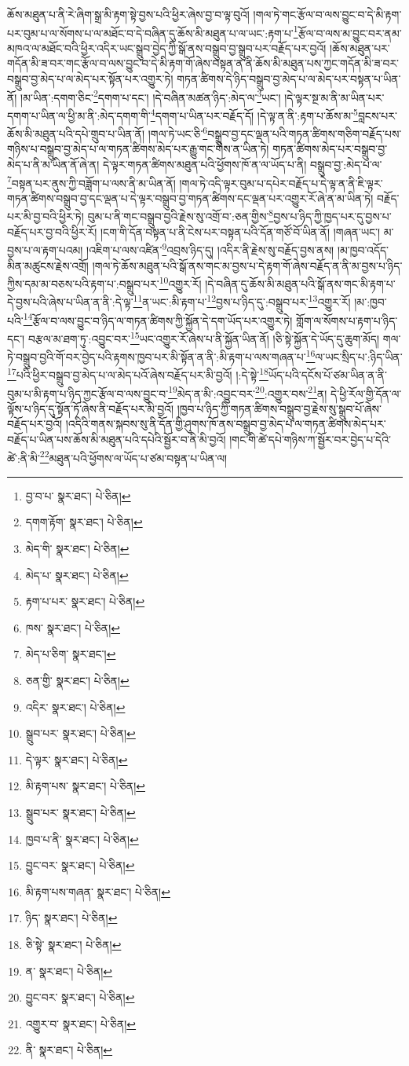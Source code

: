 ཆོས་མཐུན་པ་ནི་རེ་ཞིག་སྒྲ་མི་རྟག་སྟེ་བྱས་པའི་ཕྱིར་ཞེས་བྱ་བ་ལྟ་བུའོ། །གལ་ཏེ་གང་རྩོལ་བ་ལས་བྱུང་བ་དེ་མི་རྟག་པར་བུམ་པ་ལ་སོགས་པ་ལ་མཐོང་བ་དེ་བཞིན་དུ་ཆོས་མི་མཐུན་པ་ལ་ཡང་:རྟག་པ་\footnote{བྱ་བ་པ་  སྣར་ཐང་།  པེ་ཅིན། }རྩོལ་བ་ལས་མ་བྱུང་བར་ནམ་མཁའ་ལ་མཐོང་བའི་ཕྱིར་འདིར་ཡང་སྒྲུབ་བྱེད་ཀྱི་སྒོ་ནས་བསྒྲུབ་བྱ་སྒྲུབ་པར་བརྗོད་པར་བྱའོ། །ཆོས་མཐུན་པར་གདོན་མི་ཟ་བར་གང་རྩོལ་བ་ལས་བྱུང་བ་དེ་མི་རྟག་གོ་ཞེས་བསྟན་ན་ནི་ཆོས་མི་མཐུན་པས་ཀྱང་གདོན་མི་ཟ་བར་བསྒྲུབ་བྱ་མེད་པ་ལ་མེད་པར་སྟོན་པར་འགྱུར་ཏེ། གཏན་ཚིགས་དེ་ཉིད་བསྒྲུབ་བྱ་མེད་པ་ལ་མེད་པར་བསྟན་པ་ཡིན་ནོ། །མ་ཡིན་:དགག་ཅིང་\footnote{དགག་རྟོག་  སྣར་ཐང་།  པེ་ཅིན། }དགག་པ་དང་། །དེ་བཞིན་མཚན་ཉིད་:མེད་ལ་\footnote{མེད་གི་  སྣར་ཐང་།  པེ་ཅིན། }ཡང་། །དེ་ལྟར་སྔ་མ་ནི་མ་ཡིན་པར་དགག་པ་ཡིན་ལ་ཕྱི་མ་ནི་:མེད་དགག་གི་\footnote{མེད་པ་  སྣར་ཐང་།  པེ་ཅིན། }དགག་པ་ཡིན་པར་བརྗོད་དོ། །དེ་ལྟ་ན་ནི་:རྟག་པ་ཆོས་མ་\footnote{རྟག་པ་པར་  སྣར་ཐང་།  པེ་ཅིན། }བླངས་པར་ཆོས་མི་མཐུན་པའི་དཔེ་གྲུབ་པ་ཡིན་ནོ། །གལ་ཏེ་ཡང་ཅི་\footnote{ཁས་  སྣར་ཐང་།  པེ་ཅིན། }བསྒྲུབ་བྱ་དང་ལྡན་པའི་གཏན་ཚིགས་གཅིག་བརྗོད་པས་གཉིས་པ་བསྒྲུབ་བྱ་མེད་པ་ལ་གཏན་ཚིགས་མེད་པར་རྒྱུ་གང་གིས་ན་ཡིན་ཏེ། གཏན་ཚིགས་མེད་པར་བསྒྲུབ་བྱ་མེད་པ་ནི་མ་ཡིན་ནོ་ཞེ་ན། དེ་ལྟར་གཏན་ཚིགས་མཐུན་པའི་ཕྱོགས་ཁོ་ན་ལ་ཡོད་པ་ནི། བསྒྲུབ་བྱ་:མེད་པ་ལ་\footnote{མེད་པ་ཅིག་  སྣར་ཐང་། }བསྟན་པར་ནུས་ཀྱི་བཟློག་པ་ལས་ནི་མ་ཡིན་ནོ། །གལ་ཏེ་འདི་ལྟར་བུམ་པ་དཔེར་བརྗོད་པ་དེ་ལྟ་ན་ནི་ཇི་ལྟར་གཏན་ཚིགས་བསྒྲུབ་བྱ་དང་ལྡན་པ་དེ་ལྟར་བསྒྲུབ་བྱ་གཏན་ཚིགས་དང་ལྡན་པར་འགྱུར་རོ་ཞེ་ན་མ་ཡིན་ཏེ། བརྗོད་པར་མི་བྱ་བའི་ཕྱིར་ཏེ། བུམ་པ་ནི་གང་བསྒྲུབ་བྱའི་རྗེས་སུ་འགྲོ་བ་:ཅན་གྱིས་\footnote{ཅན་གྱི་  སྣར་ཐང་།  པེ་ཅིན། }བྱས་པ་ཉིད་ཀྱི་ཁྱད་པར་དུ་བྱས་པ་བརྗོད་པར་བྱ་བའི་ཕྱིར་རོ། །ངག་གི་དོན་བསྟན་པ་ནི་ངེས་པར་བསྟན་པའི་དོན་གཙོ་བོ་ཡིན་ནོ། །གཞན་ཡང་། མ་བྱས་པ་ལ་རྟག་པའམ། །འཇིག་པ་ལས་འཛིན་\footnote{འདིར་  སྣར་ཐང་།  པེ་ཅིན། }འབྲས་ཉིད་དུ། །འདིར་ནི་རྗེས་སུ་བརྗོད་བྱས་ནས། །མ་ཁྱབ་འདོད་མིན་མཚུངས་རྗེས་འགྲོ། །གལ་ཏེ་ཆོས་མཐུན་པའི་སྒོ་ནས་གང་མ་བྱས་པ་དེ་རྟག་གོ་ཞེས་བརྗོད་ན་ནི་མ་བྱས་པ་ཉིད་ཀྱིས་དམ་མ་བཅས་པའི་རྟག་པ་:བསྒྲུབ་པར་\footnote{སྒྲུབ་པར་  སྣར་ཐང་།  པེ་ཅིན། }འགྱུར་རོ། །དེ་བཞིན་དུ་ཆོས་མི་མཐུན་པའི་སྒོ་ནས་གང་མི་རྟག་པ་དེ་བྱས་པའི་ཞེས་པ་ཡིན་ན་ནི་:དེ་ལྟ་\footnote{དེ་ལྟར་  སྣར་ཐང་།  པེ་ཅིན། }ན་ཡང་:མི་རྟག་པ་\footnote{མི་རྟག་པས་  སྣར་ཐང་།  པེ་ཅིན། }བྱས་པ་ཉིད་དུ་:བསྒྲུབ་པར་\footnote{སྒྲུབ་པར་  སྣར་ཐང་།  པེ་ཅིན། }འགྱུར་རོ། །མ་:ཁྱབ་པའི་\footnote{ཁྱབ་པ་ནི་  སྣར་ཐང་།  པེ་ཅིན། }རྩོལ་བ་ལས་བྱུང་བ་ཉིད་ལ་གཏན་ཚིགས་ཀྱི་སྐྱོན་དེ་དག་ཡོད་པར་འགྱུར་ཏེ། གློག་ལ་སོགས་པ་རྟག་པ་ཉིད་དང་། བརྩལ་མ་ཐག་ཏུ་:འབྱུང་བར་\footnote{བྱུང་བར་  སྣར་ཐང་།  པེ་ཅིན། }ཡང་འགྱུར་རོ་ཞེས་པ་ནི་སྐྱོན་ཡིན་ནོ། །ཅི་སྟེ་སྐྱོན་དེ་ཡོད་དུ་ཆུག་མོད། གལ་ཏེ་བསྒྲུབ་བྱའི་གོ་བར་བྱེད་པའི་རྟགས་ཁྱབ་པར་མི་སྟོན་ན་ནི་:མི་རྟག་པ་ལས་གཞན་པ་\footnote{མི་རྟག་པས་གཞན་  སྣར་ཐང་།  པེ་ཅིན། }ལ་ཡང་སྲིད་པ་:ཉིད་ཡིན་\footnote{ཉིད་  སྣར་ཐང་།  པེ་ཅིན། }པའི་ཕྱིར་བསྒྲུབ་བྱ་མེད་པ་ལ་མེད་པའོ་ཞེས་བརྗོད་པར་མི་བྱའོ། །:དེ་སྟེ་\footnote{ཅི་སྟེ་  སྣར་ཐང་།  པེ་ཅིན། }ཡོད་པའི་དངོས་པོ་ཙམ་ཡིན་ན་ནི་བུམ་པ་མི་རྟག་པ་ཉིད་ཀྱང་རྩོལ་བ་ལས་བྱུང་བ་\footnote{ན་  སྣར་ཐང་།  པེ་ཅིན། }མེད་ན་མི་:འབྱུང་བར་\footnote{བྱུང་བར་  སྣར་ཐང་།  པེ་ཅིན། }:འགྱུར་བས་\footnote{འགྱུར་བ་  སྣར་ཐང་།  པེ་ཅིན། }ན། དེ་ཕྱི་རོལ་གྱི་དོན་ལ་ལྟོས་པ་ཉིད་དུ་སྟོན་ཏོ་ཞེས་ནི་བརྗོད་པར་མི་བྱའོ། །ཁྱབ་པ་ཉིད་ཀྱི་གཏན་ཚིགས་བསྒྲུབ་བྱ་རྗེས་སུ་སྒྲུབ་པོ་ཞེས་བརྗོད་པར་བྱའོ། །འདིའི་གནས་སྐབས་སུ་ནི་དོན་གྱི་ཤུགས་ཁོ་ནས་བསྒྲུབ་བྱ་མེད་པ་ལ་གཏན་ཚིགས་མེད་པར་བརྗོད་པ་ཡིན་པས་ཆོས་མི་མཐུན་པའི་དཔེའི་སྦྱོར་བ་ནི་མི་བྱའོ། །གང་གི་ཚེ་དཔེ་གཉིས་ཀ་སྦྱོར་བར་བྱེད་པ་དེའི་ཚེ་:ནི་མི་\footnote{ནི་  སྣར་ཐང་།  པེ་ཅིན། }མཐུན་པའི་ཕྱོགས་ལ་ཡོད་པ་ཙམ་བསྟན་པ་ཡིན་ལ། 